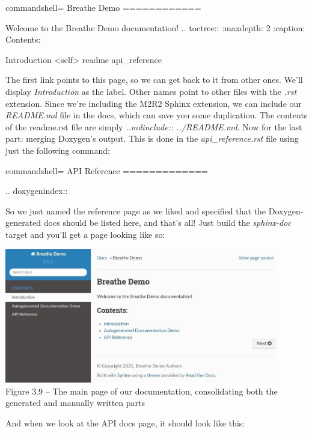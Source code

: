 \begin{tcblisting}{commandshell={}}
Breathe Demo
============

Welcome to the Breathe Demo documentation!
.. toctree::
    :maxdepth: 2
    :caption: Contents:
   
Introduction <self>
    readme
    api_reference
\end{tcblisting}

The first link points to this page, so we can get back to it from other ones. We'll display \textit{Introduction} as the label. Other names point to other files with the \textit{.rst} extension. Since we're including the M2R2 Sphinx extension, we can include our \textit{README.md} file in the docs, which can save you some duplication. The contents of the readme.rst file are simply \textit{..mdinclude:: ../README.md}. Now for the last part: merging Doxygen's output. This is done in the \textit{api\_reference.rst} file using just the following command:

\begin{tcblisting}{commandshell={}}
API Reference
=============

.. doxygenindex::

\end{tcblisting}

So we just named the reference page as we liked and specified that the Doxygen-generated docs should be listed here, and that's all! Just build the \textit{sphinx-doc} target and you'll get a page looking like so:

\begin{center}
\includegraphics[width=0.9\textwidth]{content/1/chapter3/images/9.jpg}\\
Figure 3.9 – The main page of our documentation, consolidating both the generated and manually written parts
\end{center}

And when we look at the API docs page, it should look like this:

